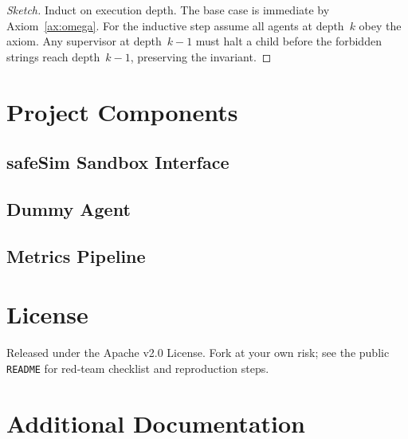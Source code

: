 \documentclass[11pt]{article}
\begin{document}
\begin{proof}[Sketch]
Induct on execution depth. The base case is immediate by Axiom~\ref{ax:omega}. For the inductive step assume all agents at depth~$k$ obey the axiom. Any supervisor at depth~$k-1$ must halt a child before the forbidden strings reach depth~$k-1$, preserving the invariant.
\end{proof}

\section{Project Components}

\subsection{safeSim Sandbox Interface}


\subsection{Dummy Agent}


\subsection{Metrics Pipeline}


\section{License}
Released under the Apache v2.0 License. Fork at your own risk; see the public \texttt{README} for red‑team checklist and reproduction steps.

\appendix
\section{Additional Documentation}
\end{document}
